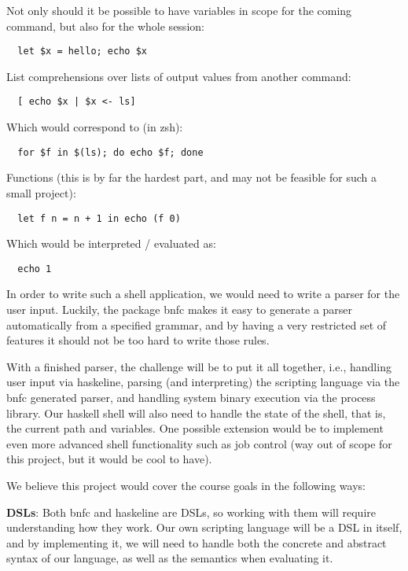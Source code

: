 \documentclass[11pt,a4paper]{article}
\begin{document}
Not only should it be possible to have variables in scope for the coming
command, but also for the whole session:

\begin{verbatim}
  let $x = hello; echo $x
\end{verbatim}

List comprehensions over lists of output values from another command:

\begin{verbatim}
  [ echo $x | $x <- ls]
\end{verbatim}

Which would correspond to (in zsh):

\begin{verbatim}
  for $f in $(ls); do echo $f; done
\end{verbatim}

Functions (this is by far the hardest part, and may not be feasible for such a small project):

\begin{verbatim}
  let f n = n + 1 in echo (f 0)
\end{verbatim}

Which would be interpreted / evaluated as:

\begin{verbatim}
  echo 1
\end{verbatim}

In order to write such a shell application, we would need to write a parser for
the user input. Luckily, the package bnfc makes it easy to generate a parser
automatically from a specified grammar, and by having a very restricted set of
features it should not be too hard to write those rules.

With a finished parser, the challenge will be to put it all together, i.e.,
handling user input via haskeline, parsing (and interpreting) the scripting
language via the bnfc generated parser, and handling system binary execution via
the process library. Our haskell shell will also need to handle the state of the
shell, that is, the current path and variables. One possible extension would be
to implement even more advanced shell functionality such as job control (way out
of scope for this project, but it would be cool to have).


We believe this project would cover the course goals in the following ways:

\textbf{DSLs}: Both bnfc and haskeline are DSLs, so working with them will require
understanding how they work. Our own scripting language will be a DSL in itself,
and by implementing it, we will need to handle both the concrete and abstract
syntax of our language, as well as the semantics when evaluating it.
\end{document}
